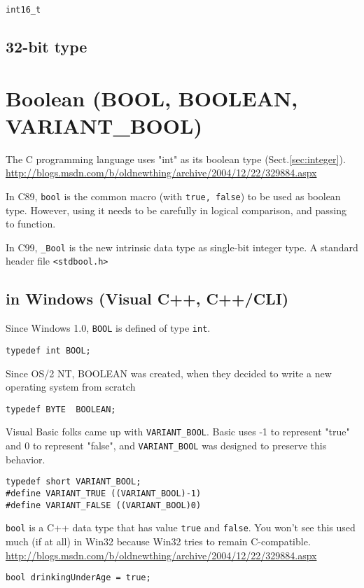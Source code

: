 \begin{verbatim}
int16_t
\end{verbatim}
\subsection{32-bit type}


\section{Boolean (BOOL, BOOLEAN, VARIANT\_BOOL)}
\label{sec:Boolean}

The C programming language uses "int" as its boolean type (Sect.\ref{sec:integer}).
\url{http://blogs.msdn.com/b/oldnewthing/archive/2004/12/22/329884.aspx}

In C89, \verb!bool! is the common macro (with \verb!true, false!) to be used as boolean
type. However, using it needs to be carefully in logical comparison, and passing
to function.

In C99, \verb!_Bool! is the new intrinsic data type as single-bit integer type.
A standard header file \verb!<stdbool.h>!

\subsection{in Windows (Visual C++, C++/CLI)}

Since Windows 1.0, \verb!BOOL! is defined of type \verb!int!.
\begin{verbatim}
typedef int BOOL;
\end{verbatim}

Since OS/2 NT, BOOLEAN was created, when they decided to write a new operating
system from scratch
\begin{verbatim}
typedef BYTE  BOOLEAN;
\end{verbatim}

Visual Basic folks came up with \verb!VARIANT_BOOL!.  Basic uses -1 to represent
"true" and 0 to represent "false", and \verb!VARIANT_BOOL! was designed to
preserve this behavior.
\begin{verbatim}
typedef short VARIANT_BOOL;
#define VARIANT_TRUE ((VARIANT_BOOL)-1)
#define VARIANT_FALSE ((VARIANT_BOOL)0)
\end{verbatim}


\verb!bool! is a C++ data type that has value \verb!true! and \verb!false!. You
won't see this used much (if at all) in Win32 because Win32 tries to remain
C-compatible.
\url{http://blogs.msdn.com/b/oldnewthing/archive/2004/12/22/329884.aspx}
\begin{verbatim}
bool drinkingUnderAge = true;
\end{verbatim}

